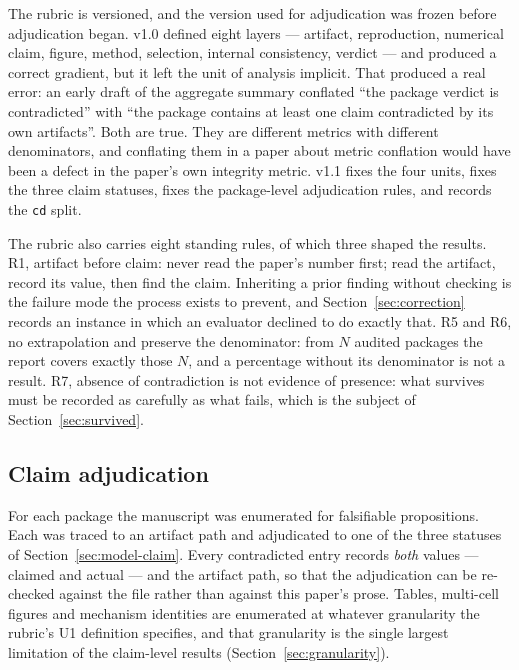\documentclass[sigconf,review]{acmart}
\newcommand{\pkg}[1]{\texttt{#1}}
\begin{document}
The rubric is versioned, and the version used for adjudication was frozen
before adjudication began. v1.0 defined eight layers --- artifact, reproduction,
numerical claim, figure, method, selection, internal consistency, verdict ---
and produced a correct gradient, but it left the unit of analysis implicit.
That produced a real error: an early draft of the aggregate summary conflated
``the package verdict is contradicted'' with ``the package contains at least
one claim contradicted by its own artifacts''. Both are true. They are
different metrics with different denominators, and conflating them in a paper
about metric conflation would have been a defect in the paper's own integrity
metric. v1.1 fixes the four units, fixes the three claim statuses, fixes the
package-level adjudication rules, and records the \pkg{cd} split.

The rubric also carries eight standing rules, of which three shaped the
results. R1, artifact before claim: never read the paper's number first; read
the artifact, record its value, then find the claim. Inheriting a prior
finding without checking is the failure mode the process exists to prevent,
and Section~\ref{sec:correction} records an instance in which an evaluator
declined to do exactly that. R5 and R6, no extrapolation and preserve the
denominator: from $N$ audited packages the report covers exactly those $N$,
and a percentage without its denominator is not a result. R7, absence of
contradiction is not evidence of presence: what survives must be recorded as
carefully as what fails, which is the subject of Section~\ref{sec:survived}.

\subsection{Claim adjudication}
\label{sec:method-claims}

For each package the manuscript was enumerated for falsifiable propositions.
Each was traced to an artifact path and adjudicated to one of the three
statuses of Section~\ref{sec:model-claim}. Every contradicted entry records
\emph{both} values --- claimed and actual --- and the artifact path, so that
the adjudication can be re-checked against the file rather than against this
paper's prose. Tables, multi-cell figures and mechanism identities are
enumerated at whatever granularity the rubric's U1 definition specifies, and
that granularity is the single largest limitation of the claim-level results
(Section~\ref{sec:granularity}).
\end{document}
